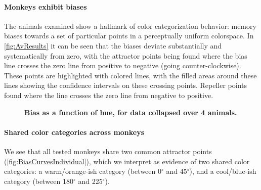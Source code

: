 
\paragraph{Monkeys exhibit biases} %

The animals examined show a hallmark of color categorization behavior: memory biases towards a set of particular points in a perceptually uniform colorspace.
In \autoref{fig:AvResults} it can be seen that the biases deviate substantially and systematically from zero, with the attractor points being found where the bias line crosses the zero line from positive to negative (going counter-clockwise). These points are highlighted with colored lines, with the filled areas around these lines showing the confidence intervals on these crossing points. Repeller points found where the line crosses the zero line from negative to positive.

\begin{figure}
    \centering
    \begin{subfigure}[b]{\textwidth}
         \centering
         \caption{}
         
         \label{fig:CombinedLinear}
    \end{subfigure}
    \hfill
    \begin{subfigure}[b]{\textwidth}
         \centering
         \caption{}
         
         \label{fig:CombinedPolar}
    \end{subfigure}
    \caption{\textbf{Bias as a function of hue, for data collapsed over 4 animals.} 
    }
    \label{fig:AvResults}
\end{figure}

\paragraph{Shared color categories across monkeys}

We see that all tested monkeys share two common attractor points (\autoref{fig:BiasCurvesIndividual}), which we interpret as evidence of two shared color categories: a warm/orange-ish category (between 0$^\circ$ and 45$^\circ$), and a cool/blue-ish category (between 180$^\circ$ and 225$^\circ$). 



